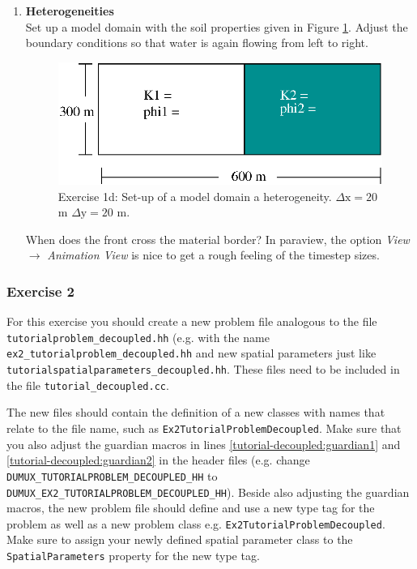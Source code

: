 \begin{enumerate}
\item \textbf{Heterogeneities}  \\
Set up a model domain with the soil properties given in Figure \ref{tutorial-deoucpled:exercise1_d}. Adjust the boundary conditions so that water is again flowing from left to right.
\begin{figure}[h]
\centering
\includegraphics[width=0.5\linewidth,keepaspectratio]{EPS/exercise1_c.eps}
\caption{Exercise 1d: Set-up of a model domain a heterogeneity. $\Delta \text{x} = 20$ m $\Delta \text{y} = 20$ m.}\label{tutorial-deoucpled:exercise1_d}
\end{figure}
When does the front cross the material border? In paraview, the option \textit{View} $\rightarrow$ \textit{Animation View} is nice to get a rough feeling of the timestep sizes.
\end{enumerate}

\subsubsection{Exercise 2}
For this exercise you should create a new problem file analogous to
the file \texttt{tutorialproblem\_decoupled.hh} (e.g. with the name 
\texttt{ex2\_tutorialproblem\_decoupled.hh} and new spatial parameters 
just like \texttt{tutorialspatialparameters\_decoupled.hh}. These files need to
be included in the file \texttt{tutorial\_decoupled.cc}. 

The new files should contain the definition of a new classes with 
names that relate to the file name, such as \texttt{Ex2TutorialProblemDecoupled}. 
Make sure that you also adjust the guardian
macros in lines \ref{tutorial-decoupled:guardian1} and \ref{tutorial-decoupled:guardian2}
 in the header files (e.g. change \\
\texttt{DUMUX\_TUTORIALPROBLEM\_DECOUPLED\_HH} to
\texttt{DUMUX\_EX2\_TUTORIALPROBLEM\_DECOUPLED\_HH}).  Beside also adjusting the guardian macros, 
the new problem file should define and use a new type tag for the problem as well as a new problem class
e.g. \texttt{Ex2TutorialProblemDecoupled}. Make sure to assign your newly defined spatial 
parameter class to the \texttt{SpatialParameters} property for the new 
type tag. 

